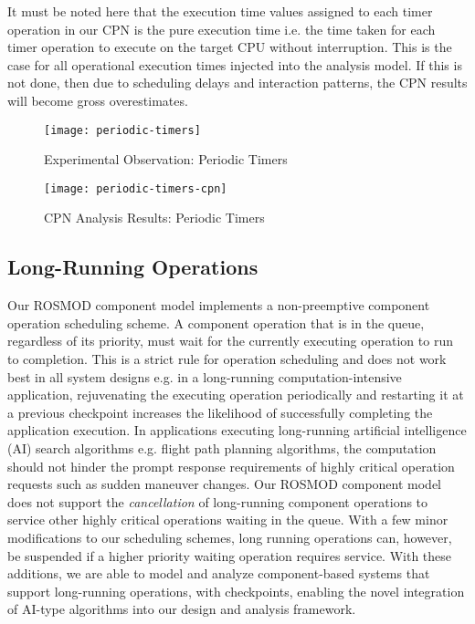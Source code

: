 It must be noted here that the execution time values assigned to each timer operation in our CPN is the pure execution time i.e. the time taken for each timer operation to execute on the target CPU without interruption. This is the case for all operational execution times injected into the analysis model. If this is not done, then due to scheduling delays and interaction patterns, the CPN results will become gross overestimates. 

\begin{figure}[h]
	\centering
	\texttt{[image: periodic-timers]}
	\caption{Experimental Observation: Periodic Timers}
	\label{fig:periodic-timers}
\end{figure}
\FloatBarrier

\begin{figure}[h]
	\centering
	\texttt{[image: periodic-timers-cpn]}
	\caption{CPN Analysis Results: Periodic Timers}
	\label{fig:periodic-timers-cpn}
\end{figure}
\FloatBarrier

\subsection{Long-Running Operations}
\label{sec:long_running_operations}

Our ROSMOD component model implements a non-preemptive component operation scheduling scheme. A component operation that is in the queue, regardless of its priority, must wait for the currently executing operation to run to completion. This is a strict rule for operation scheduling and does not work best in all system designs e.g. in a long-running computation-intensive application, rejuvenating the executing operation periodically and restarting it at a previous checkpoint increases the likelihood of successfully completing the application execution. In applications executing long-running artificial intelligence (AI) search algorithms e.g. flight path planning algorithms, the computation should not hinder the prompt response requirements of highly critical operation requests such as sudden maneuver changes. Our ROSMOD component model does not support the \emph{cancellation} of long-running component operations to service other highly critical operations waiting in the queue. With a few minor modifications to our scheduling schemes, long running operations can, however, be suspended if a higher priority waiting operation requires service. With these additions, we are able to model and analyze component-based systems that support long-running operations, with checkpoints, enabling the novel integration of AI-type algorithms into our design and analysis framework. 

